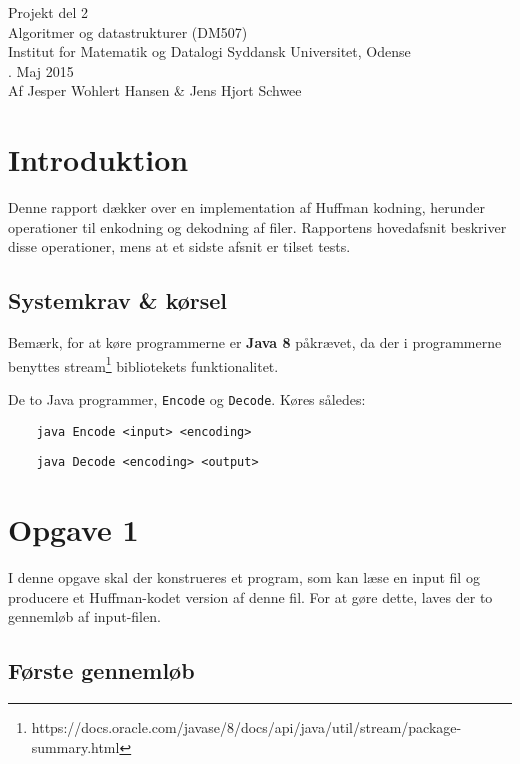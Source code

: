 \documentclass{article}
\begin{document}
{\centering
\huge
Projekt del 2\\
Algoritmer og datastrukturer (DM507)\\
\large
\bigskip
Institut for Matematik og Datalogi Syddansk Universitet, Odense\\
. Maj 2015\\
\bigskip
Af Jesper Wohlert Hansen \& Jens Hjort Schwee\\
}
\newpage

\section*{Introduktion}
Denne rapport dækker over en implementation af Huffman kodning, herunder operationer til enkodning og dekodning af filer. Rapportens hovedafsnit beskriver disse operationer, mens at et sidste afsnit er tilset tests.

\subsection*{Systemkrav \& kørsel}
Bemærk, for at køre programmerne er \textbf{Java 8} påkrævet, da der i programmerne benyttes stream\footnote{https://docs.oracle.com/javase/8/docs/api/java/util/stream/package-summary.html} bibliotekets funktionalitet.

\bigskip

De to Java programmer, \texttt{Encode} og \texttt{Decode}. Køres således:

\begin{verbatim}
    java Encode <input> <encoding>
\end{verbatim}

\begin{verbatim}
    java Decode <encoding> <output>
\end{verbatim}

\newpage

\section*{Opgave 1}
I denne opgave skal der konstrueres et program, som kan læse en input fil og producere et Huffman-kodet version af denne fil. For at gøre dette, laves der to gennemløb af input-filen.

\subsection*{Første gennemløb}
\end{document}
